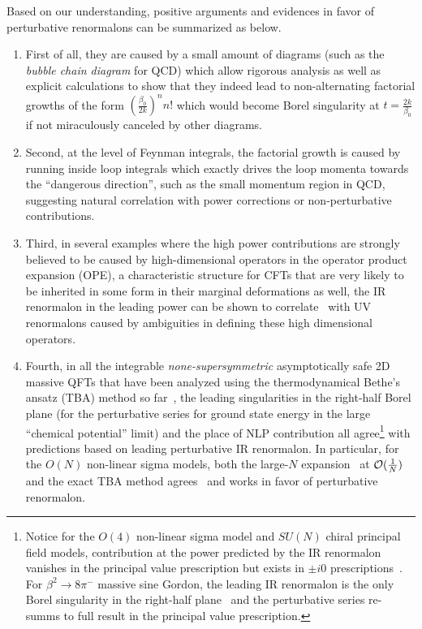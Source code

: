 \documentclass[a4paper,11pt]{article}
\begin{document}
Based on our understanding,  positive arguments and evidences in favor of perturbative renormalons can be summarized as below. 
\begin{enumerate}
    \item First of all, they are caused by a small amount of diagrams (such as the {\it bubble chain diagram} for QCD) which allow rigorous analysis as well as explicit calculations to show that they indeed lead to non-alternating factorial growths of the form $(\frac{\beta_0}{2 k})^n n!$ which would become Borel singularity at $t=\frac{2 k}{\beta_0}$ if not miraculously canceled by other diagrams. 
    \item Second, at the level of Feynman integrals, the factorial growth is caused by running inside loop integrals which exactly drives the loop momenta towards the ``dangerous direction'', such as the small momentum region in QCD,  suggesting natural correlation with power corrections or non-perturbative contributions.
    \item  Third, in several examples where the high power contributions are strongly believed to be caused by high-dimensional operators in the operator product expansion (OPE), a characteristic structure for CFTs that are very likely to be inherited in some form in their marginal deformations as well, the IR renormalon in the leading power can be shown to correlate~\cite{Shifman:1978bx,David:1983gz,David:1985xj,Mueller:1984vh,Ji:1994md,Beneke:1998ui,Beneke:1998eq,Shifman:2013uka,Dunne:2015eoa} with UV renormalons caused by ambiguities in defining these high dimensional operators.
    \item Fourth, in all the integrable {\it none-supersymmetric} asymptotically safe 2D massive QFTs that have been analyzed using the thermodynamical Bethe's ansatz (TBA) method so far~\cite{Marino:2019eym,Bajnok:2021dri,Marino:2021dzn,Marino:2022ykm,Bajnok:2022xgx,Bajnok:2022rtu,Reis:2022tni,Marino:2023epd}, the leading singularities in the right-half Borel plane (for the perturbative series for ground state energy in the large ``chemical potential'' limit) and the place of NLP contribution all agree\footnote{Notice for the $O(4)$ non-linear sigma model and $SU(N)$ chiral principal field models, contribution at the power predicted by the IR renormalon vanishes in the principal value prescription but exists in $\pm i0$ prescriptions~\cite{Marino:2021dzn,Bajnok:2021dri,Reis:2022tni}. For $\beta^{2}\rightarrow 8\pi^-$ massive sine Gordon, the leading IR renormalon is the only Borel singularity in the right-half plane~\cite{Liu:2023tft} and the perturbative series re-summs to full result in the principal value prescription. } with predictions based on leading perturbative IR renormalon. In particular, for the $O(N)$ non-linear sigma models, both the large-$N$ expansion~\cite{David:1982qv,David:1983gz,Novikov:1984ac,David:1985xj,Beneke:1998eq} at ${\cal O}(\frac{1}{N})$ and the exact TBA method agrees~\cite{DiPietro:2021yxb,Marino:2021dzn,Marino:2021six} and works in favor of perturbative renormalon.

\end{enumerate}
\end{document}
